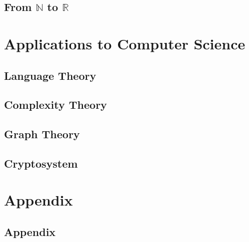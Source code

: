 \documentclass{report}
\theoremstyle{break}
\begin{document}
		\chapter{From $\mathbb{N}$ to $\mathbb{R}$}
			

	\part{Applications to Computer Science}
	
		\chapter{Language Theory}
			
		
		\chapter{Complexity Theory}
			
		
		\chapter{Graph Theory}
			
		
		\chapter{Cryptosystem}
			
	
	\part{Appendix}
		\chapter{Appendix}
			
\end{document}
